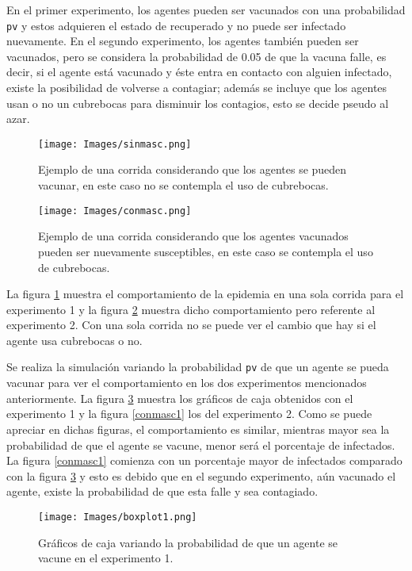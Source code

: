 \documentclass[final,6p,times,twocolumn]{elsarticle}
\begin{document}
	En el primer experimento, los agentes pueden ser vacunados con una probabilidad \texttt{pv} y estos adquieren el estado de recuperado y no puede ser infectado nuevamente. En el segundo experimento, los agentes también pueden ser vacunados, pero se considera la probabilidad de 0.05 de que la vacuna falle, es decir, si el agente está vacunado y éste entra en contacto con alguien infectado, existe la posibilidad de volverse a contagiar; además se incluye que los agentes usan o no un cubrebocas para disminuir los contagios, esto se decide pseudo al azar. 
	\begin{figure}
		\label{sinmasc}
		\centering
		\texttt{[image: Images/sinmasc.png]}
		\caption{Ejemplo de una corrida considerando que los agentes se pueden vacunar, en este caso no se contempla el uso de cubrebocas.}
	\end{figure}
	\begin{figure}
		\label{conmasc}
		\centering
		\texttt{[image: Images/conmasc.png]}
		\caption{Ejemplo de una corrida considerando que los agentes vacunados pueden ser nuevamente susceptibles, en este caso se contempla el uso de cubrebocas.}
	\end{figure}
	La figura \ref{sinmasc} muestra el comportamiento de la epidemia en una sola corrida para el experimento 1 y la figura \ref{conmasc} muestra dicho comportamiento pero referente al experimento 2. Con una sola corrida no se puede ver el cambio que hay si el agente usa cubrebocas o no. 
	
	
	Se realiza la simulación variando la probabilidad \texttt{pv} de que un agente se pueda vacunar para ver el comportamiento en los dos experimentos mencionados anteriormente. La figura \ref{sinmasc1} muestra los gráficos de caja obtenidos con el experimento 1 y la figura \ref{conmasc1} los del experimento 2. Como se puede apreciar en dichas figuras, el comportamiento es similar, mientras mayor sea la probabilidad de que el agente se vacune, menor será el porcentaje de infectados. La figura \ref{conmasc1} comienza con un porcentaje mayor de infectados comparado con la figura \ref{sinmasc1} y esto es debido que en el segundo experimento, aún vacunado el agente, existe la probabilidad de que esta falle y sea contagiado. 
	
	\begin{figure}
		\label{sinmasc1}
		\centering
		\texttt{[image: Images/boxplot1.png]}
		\caption{Gráficos de caja variando la probabilidad de que un agente se vacune en el experimento 1.}
	\end{figure}
	
\end{document}
